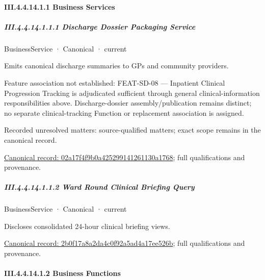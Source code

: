 \paragraph*{III.4.4.14.1.1 Business Services}
\label{navigation:III.4.4.14.1.1}

\subparagraph*{III.4.4.14.1.1.1 Discharge Dossier Packaging Service}
\label{navigation:III.4.4.14.1.1.1}

\label{element:02a17f4f9b0a425299141261130a1768}
{\small BusinessService · Canonical · current}\par

Emits canonical discharge summaries to GPs and community providers.



Feature association not established: FEAT-SD-08 — Inpatient Clinical Progression Tracking is adjudicated sufficient through general clinical-information responsibilities above. Discharge-dossier assembly/publication remains distinct; no separate clinical-tracking Function or replacement association is assigned.


{\small Recorded unresolved matters: source-qualified matters; exact scope remains in the canonical record.}\par
{\footnotesize \href{../../../../continuum/business/business-service/02a17f4f9b0a425299141261130a1768.md}{Canonical record: 02a17f4f9b0a425299141261130a1768}; full qualifications and provenance.}\par
\subparagraph*{III.4.4.14.1.1.2 Ward Round Clinical Briefing Query}
\label{navigation:III.4.4.14.1.1.2}

\label{element:2b0f17a8a2da4c0f92a5ad4a17ee526b}
{\small BusinessService · Canonical · current}\par

Discloses consolidated 24-hour clinical briefing views.


{\footnotesize \href{../../../../continuum/business/business-service/2b0f17a8a2da4c0f92a5ad4a17ee526b.md}{Canonical record: 2b0f17a8a2da4c0f92a5ad4a17ee526b}; full qualifications and provenance.}\par
\paragraph*{III.4.4.14.1.2 Business Functions}
\label{navigation:III.4.4.14.1.2}

